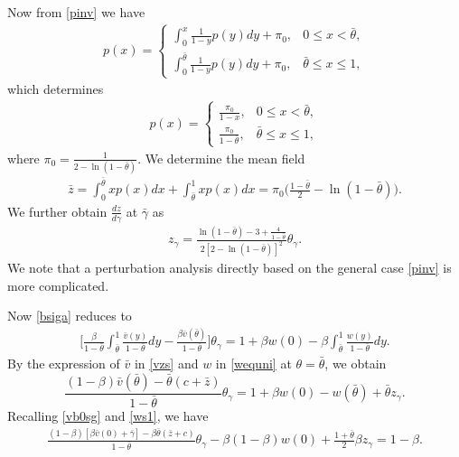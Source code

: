\documentclass[graybox]{svmult}
\begin{document}
Now from \eqref{pinv} we have
\begin{align}
p(x)=\begin{cases}
 \displaystyle
\int_0^x \frac{1}{1-y} p(y) dy+\pi_0,& 0\le x<\bar \theta, \\
 \displaystyle
\int_0^{\bar\theta} \frac{1}{1-y}p(y) dy +\pi_0,&\bar \theta\le x\le 1,
\end{cases}\nonumber
\end{align}
which determines
\begin{align}
p(x) = \begin{cases}
  \displaystyle
\frac{\pi_0}{1-x}, & 0\le x<\bar\theta,\\
 \displaystyle
\frac{\pi_0}{1-\bar \theta}, & \bar\theta\le x\le 1,
\end{cases}\nonumber
\end{align}
where $\pi_0= \frac{1}{2-\ln (1-\bar\theta)}$. We determine the mean field
\begin{align}\label{unizb}
\bar z=\int_0^{\bar\theta} x p(x)dx +\int_{\bar\theta}^1 x p(x) dx = \pi_0
\big(\frac{1-\bar\theta}{2}-\ln (1-\bar\theta)\big).
\end{align}
We further obtain $\frac{dz}{d\gamma}$ at $\bar \gamma$ as
\begin{align}\label{cse3z}
z_\gamma = \frac{\ln (1-\bar \theta)-3 +\frac{4}{1-\bar \theta}}{2[2-\ln (1-\bar \theta)]^2} \theta_\gamma.
\end{align}
We note that a perturbation analysis directly based on the general case \eqref{pinv} is more complicated.

Now \eqref{bsiga}
 reduces to
\begin{align}
\Big[\frac{\beta}{1-\bar \theta}  \int_{\bar\theta}^1 \frac{\bar v(y)}{1-\bar\theta} dy -\frac{\beta \bar v(\bar\theta)}{1-\bar\theta}\Big]
\theta_\gamma = 1+\beta w(0)- \beta \int_{\bar\theta}^1 \frac{w(y)}{1-\bar\theta} dy.\nonumber
\end{align}
By the expression of $\bar v$ in \eqref{vzs} and $w$ in \eqref{wequni} at $\theta=\bar \theta$, we obtain $$
\frac{(1-\beta)\bar v(\bar\theta)-\bar\theta (c+\bar z)}{1-\bar \theta}\theta_\gamma
=1+\beta w(0)-w(\bar \theta)+\bar\theta z_\gamma. $$
Recalling \eqref{vb0sg} and \eqref{ws1}, we have
\begin{align} \label{cse3}
\frac{(1-\beta)[\beta \bar v(0)+\bar\gamma]-\beta \bar \theta (\bar z+c) }{1-\bar \theta}\theta_\gamma
- \beta (1-\beta )
w(0)+   \frac{1+\bar\theta}{2}\beta z_\gamma = 1-\beta.
\end{align}
\end{document}
